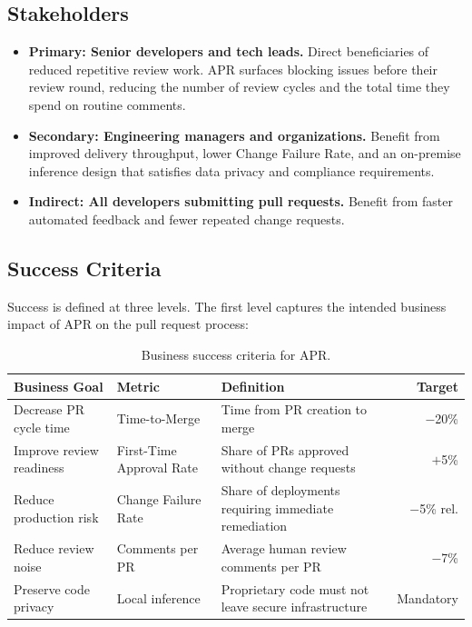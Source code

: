 \documentclass[11pt]{article}
\begin{document}
\subsection*{Stakeholders}

\begin{itemize}
    \item \textbf{Primary: Senior developers and tech leads.} Direct beneficiaries of reduced repetitive review work. APR surfaces blocking issues before their review round, reducing the number of review cycles and the total time they spend on routine comments.
    \item \textbf{Secondary: Engineering managers and organizations.} Benefit from improved delivery throughput, lower Change Failure Rate, and an on-premise inference design that satisfies data privacy and compliance requirements.
    \item \textbf{Indirect: All developers submitting pull requests.} Benefit from faster automated feedback and fewer repeated change requests.
\end{itemize}

\subsection*{Success Criteria}

Success is defined at three levels. The first level captures the intended business impact of APR on the pull request process:

\begin{table}[H]
\centering
\caption{Business success criteria for APR.}
\label{tab:business_criteria}
\begin{tabular}{@{}p{4.2cm}p{3.5cm}p{4.5cm}r@{}}
\toprule
\textbf{Business Goal} & \textbf{Metric} & \textbf{Definition} & \textbf{Target} \\ \midrule
Decrease PR cycle time & Time-to-Merge & Time from PR creation to merge & $-$20\% \\ \midrule
Improve review readiness & First-Time Approval Rate & Share of PRs approved without change requests & $+$5\% \\ \midrule
Reduce production risk & Change Failure Rate & Share of deployments requiring immediate remediation & $-$5\% rel. \\ \midrule
Reduce review noise & Comments per PR & Average human review comments per PR & $-$7\% \\ \midrule
Preserve code privacy & Local inference & Proprietary code must not leave secure infrastructure & Mandatory \\ \bottomrule
\end{tabular}
\end{table}
\end{document}
